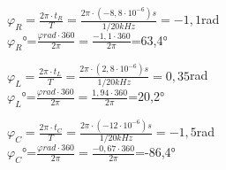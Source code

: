 \documentclass[12pt]{article}
\begin{document}
\begin{center}
${\varphi}_R=\frac{2\pi \cdot t_R}{T}=\frac{2\pi \cdot (-8,8 \cdot 10^{-6})s}{1/20kHz}=-1,1$rad\\
${\varphi}_R$°=$\frac{\varphi rad \cdot 360}{2\pi}=\frac{-1,1 \cdot 360}{2\pi}$=63,4°\\
\vspace{5mm}

${\varphi}_L=\frac{2\pi \cdot t_L}{T}=\frac{2\pi \cdot (2,8 \cdot 10^{-6})s}{1/20kHz}=0,35$rad\\
${\varphi}_L$°=$\frac{\varphi rad \cdot 360}{2\pi}=\frac{1,94 \cdot 360}{2\pi}$=20,2°\\
\vspace{5mm}

${\varphi}_C=\frac{2\pi \cdot t_C}{T}=\frac{2\pi \cdot (-12 \cdot 10^{-6})s}{1/20kHz}=-1,5$rad\\
${\varphi}_C$°=$\frac{\varphi rad \cdot 360}{2\pi}=\frac{-0,67 \cdot 360}{2\pi}$=-86,4°\\

\vspace{10mm}
\vspace{5mm}
\end{center}
\end{document}
